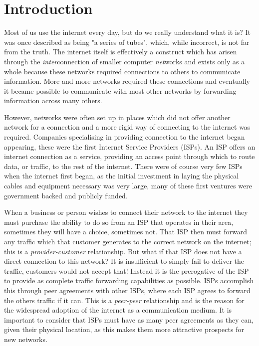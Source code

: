 \chapter{Introduction}
\label{cha:Intro}

Most of us use the internet every day, but do we really understand what it is? It was once described as being "a series of tubes", which, while incorrect, is not far from the truth. The internet itself is effectively a construct which has arisen through the \textit{inter}connection of smaller computer \textit{net}works and exists only as a whole because these networks required connections to others to communicate information. More and more networks required these connections and eventually it became possible to communicate with most other networks by forwarding information across many others. 

However, networks were often set up in places which did not offer another network for a connection and a more rigid way of connecting to the internet was required. Companies specialising in providing connection to the internet began appearing, these were the first Internet Service Providers (ISPs). An ISP offers an internet connection as a service, providing an access point through which to route data, or traffic, to the rest of the internet. There were of course very few ISPs when the internet first began, as the initial investment in laying the physical cables and equipment necessary was very large, many of these first ventures were government backed and publicly funded. 

When a business or person wishes to connect their network to the internet they must purchase the ability to do so from an ISP that operates in their area, sometimes they will have a choice, sometimes not. That ISP then must forward any traffic which that customer generates to the correct network on the internet; this is a \textit{provider-customer} relationship. But what if that ISP does not have a direct connection to this network? It is insufficient to simply fail to deliver the traffic, customers would not accept that! Instead it is the prerogative of the ISP to provide as complete traffic forwarding capabilities as possible. ISPs accomplish this through peer agreements with other ISPs, where each ISP agrees to forward the others traffic if it can. This is a \textit{peer-peer} relationship and is the reason for the widespread adoption of the internet as a communication medium. It is important to consider that ISPs must have as many peer agreements as they can, given their physical location, as this makes them more attractive prospects for new networks. 

